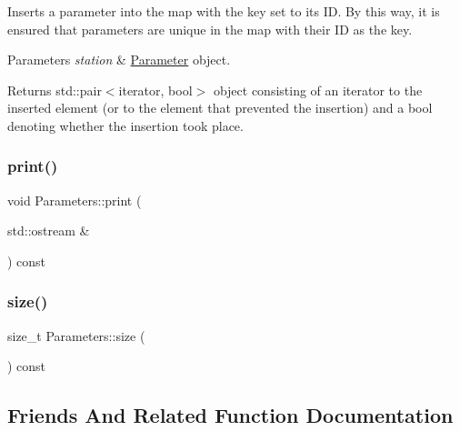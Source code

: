 Inserts a parameter into the map with the key set to its ID. By this way, it is ensured that parameters are unique in the map with their ID as the key.


\begin{DoxyParams}{Parameters}
{\em station} & \mbox{\hyperlink{class_parameter}{Parameter}} object. \\
\hline
\end{DoxyParams}
\begin{DoxyReturn}{Returns}
std\+::pair$<$iterator, bool$>$ object consisting of an iterator to the inserted element (or to the element that prevented the insertion) and a bool denoting whether the insertion took place. 
\end{DoxyReturn}
\mbox{\label{class_parameters_adff840358049658c4bb93c2b17480e74}} 
\subsubsection{\texorpdfstring{print()}{print()}}
{\footnotesize\ttfamily void Parameters\+::print (\begin{DoxyParamCaption}\item[{std\+::ostream \&}]{ }\end{DoxyParamCaption}) const}

\mbox{\label{class_parameters_ab8f80cdc799915ce3f551b385067b8f2}} 
\subsubsection{\texorpdfstring{size()}{size()}}
{\footnotesize\ttfamily size\+\_\+t Parameters\+::size (\begin{DoxyParamCaption}{ }\end{DoxyParamCaption}) const\hspace{0.3cm}{\ttfamily [noexcept]}}



\subsection{Friends And Related Function Documentation}
\mbox{\label{class_parameters_a8ffabb0f94a5698a8a711fa5c449e622}} 

